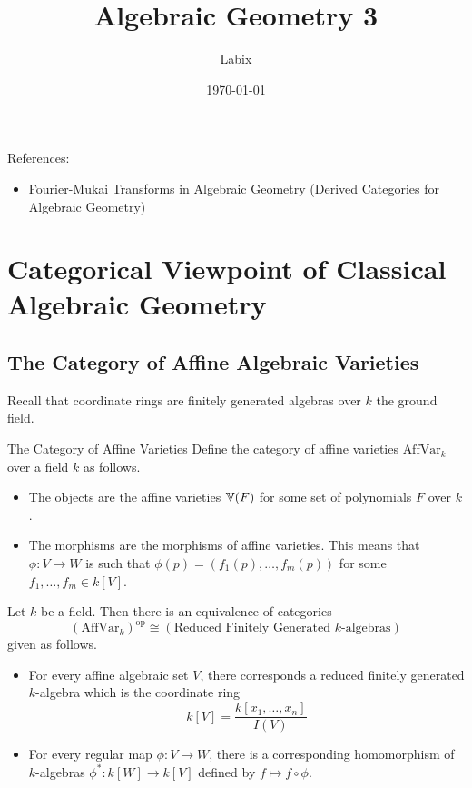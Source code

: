 \documentclass[a4paper]{article}
\title{Algebraic Geometry 3}
\author{Labix}
\date{\today}
\begin{document}
\maketitle
\begin{abstract}
\end{abstract}

References: 
\begin{itemize}
\item Fourier-Mukai Transforms in Algebraic Geometry (Derived Categories for Algebraic Geometry)
\end{itemize}
\pagebreak
\tableofcontents
\pagebreak
\section{Categorical Viewpoint of Classical Algebraic Geometry}
\subsection{The Category of Affine Algebraic Varieties}
Recall that coordinate rings are finitely generated algebras over $k$ the ground field. 

\begin{defn}{The Category of Affine Varieties}{} Define the category of affine varieties $\text{AffVar}_k$ over a field $k$ as follows. 
\begin{itemize}
\item The objects are the affine varieties $\mathbb{V}(F)$ for some set of polynomials $F$ over $k$. 
\item The morphisms are the morphisms of affine varieties. This means that $\phi:V\to W$ is such that $\phi(p)=(f_1(p),\dots,f_m(p))$ for some $f_1,\dots,f_m\in k[V]$. 
\end{itemize}
\end{defn}

\begin{prp}{}{} Let $k$ be a field. Then there is an equivalence of categories $$(\text{AffVar}_k)^\text{op}\cong(\text{Reduced Finitely Generated }k\text{-algebras})$$
given as follows. 
\begin{itemize}
\item For every affine algebraic set $V$, there corresponds a reduced finitely generated $k$-algebra which is the coordinate ring $$k[V]=\frac{k[x_1,\dots,x_n]}{I(V)}$$
\item For every regular map $\phi:V\to W$, there is a corresponding homomorphism of $k$-algebras $\phi^\ast:k[W]\to k[V]$ defined by $f\mapsto f\circ\phi$. 
\end{itemize}
\end{prp}
\end{document}

